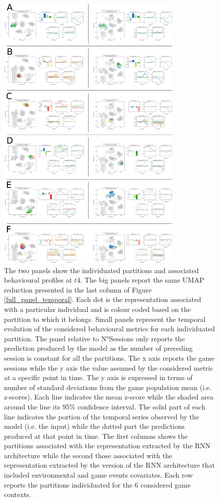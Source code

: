 \begin{figure}[ht]
\includegraphics[width=0.8\textwidth]{images/appendix_D/clust_beha_all.png}
\centering
\caption[Partitions of the representations generated by the RNN architectures from the behavioural metrics]{The two panels show the individuated partitions and associated behavioural profiles at $t4$. The big panels report the same UMAP reduction presented in the last column of Figure \ref{full_panel_temporal}. Each dot is the representation associated with a particular individual and is colour coded based on the partition to which it belongs. Small panels represent the temporal evolution of the considered behavioural metrics for each individuated partition. The panel relative to N°Sessions only reports the prediction produced by the model as the number of preceding session is constant for all the partitions. The x axis reports the game sessions while the y axis the value assumed by the considered metric at a specific point in time. The y axis is expressed in terms of number of standard deviations from the game population mean (i.e. z-scores). Each line indicates the mean z-score while the shaded area around the line its 95\% confidence interval. The solid part of each line indicates the portion of the temporal series observed by the model (i.e. the input) while the dotted part the predictions produced at that point in time. The first columns shows the partitions associated with the representation extracted by the RNN architecture while the second those associated with the representation extracted by the version of the RNN architecture that included environmental and game events covariates. Each row reports the partitions individuated for the 6 considered game contexts.}
\label{partition_rnn_behaviour} 
\end{figure}
\FloatBarrier

